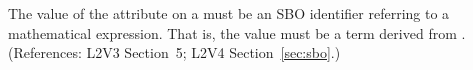 The value of the  attribute on a \Delay must be an SBO
identifier referring to a mathematical expression.  That is, the value
must be a term derived from \sbomathformula.  (References: 
L2V3 Section~5; L2V4 Section~\ref{sec:sbo}.)
